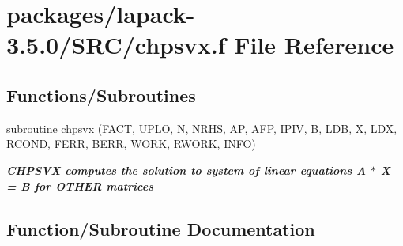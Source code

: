 \hypertarget{chpsvx_8f}{}\section{packages/lapack-\/3.5.0/\+S\+R\+C/chpsvx.f File Reference}
\label{chpsvx_8f}
\subsection*{Functions/\+Subroutines}
\begin{DoxyCompactItemize}
\item 
subroutine \hyperlink{chpsvx_8f_a39fbe6401a6d941d5c897ea13198fd74}{chpsvx} (\hyperlink{superlu__enum__consts_8h_af00a42ecad444bbda75cde1b64bd7e72a1b6692b56d378abb85bd49063721d034}{F\+A\+C\+T}, U\+P\+L\+O, \hyperlink{polmisc_8c_a0240ac851181b84ac374872dc5434ee4}{N}, \hyperlink{example__user_8c_aa0138da002ce2a90360df2f521eb3198}{N\+R\+H\+S}, A\+P, A\+F\+P, I\+P\+I\+V, B, \hyperlink{example__user_8c_a50e90a7104df172b5a89a06c47fcca04}{L\+D\+B}, X, L\+D\+X, \hyperlink{superlu__enum__consts_8h_af00a42ecad444bbda75cde1b64bd7e72a9b5c151728d8512307565994c89919d5}{R\+C\+O\+N\+D}, \hyperlink{superlu__enum__consts_8h_af00a42ecad444bbda75cde1b64bd7e72a78fd14d7abebae04095cfbe02928f153}{F\+E\+R\+R}, B\+E\+R\+R, W\+O\+R\+K, R\+W\+O\+R\+K, I\+N\+F\+O)
\begin{DoxyCompactList}\small\item\em {\bfseries  C\+H\+P\+S\+V\+X computes the solution to system of linear equations \hyperlink{classA}{A} $\ast$ X = B for O\+T\+H\+E\+R matrices} \end{DoxyCompactList}\end{DoxyCompactItemize}


\subsection{Function/\+Subroutine Documentation}
\hypertarget{chpsvx_8f_a39fbe6401a6d941d5c897ea13198fd74}{}
